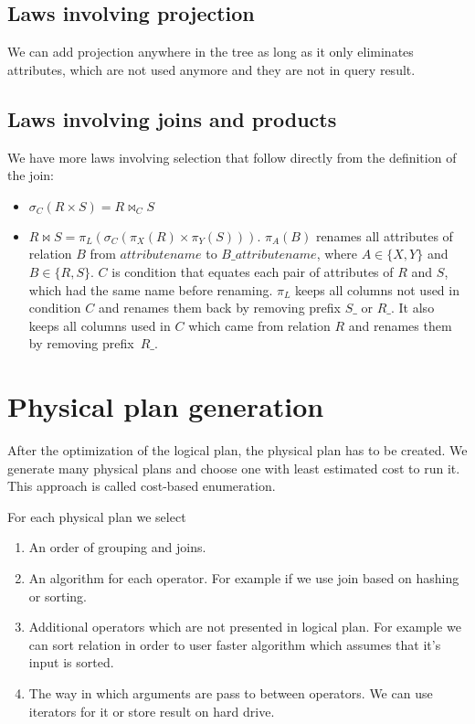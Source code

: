 \subsection{Laws involving projection}
We can add projection anywhere in the tree as long as it only eliminates attributes, which are not used anymore and they are not in query result.

\subsection{Laws involving joins and products}

We have more laws involving selection that follow directly from the definition of the join:
\begin{itemize}
\item $\sigma_{C}(R \times S)=R \Join_{C} S$
\item $R \Join S=\pi_L(\sigma_{C}(\pi_X(R) \times \pi_Y(S)))$. $\pi_A(B)$ renames all attributes of relation $B$ from $attributename$ to $B\_attributename$, where $A\in\{X,Y\}$ and $B\in\{R,S\}$. $C$ is condition that equates each pair of attributes of $R$ and $S$, which had the same name before renaming. $\pi_L$ keeps all columns not used in condition $C$ and renames them back by removing prefix $S\_$ or $R\_$. It also keeps all columns used in $C$ which came from relation $R$ and renames them by removing prefix~$R\_$.
\end{itemize}



\section{Physical plan generation}

After the optimization of the logical plan, the physical plan has to be created. We generate many physical plans and choose one with least estimated cost to run it. This approach is called cost-based enumeration.

For each physical plan we select 
\begin{enumerate}
\item An order of grouping and joins.
\item An algorithm for each operator. For example if we use join based on hashing or sorting.
\item Additional operators which are not presented in logical plan. For example we can sort relation in order to user faster algorithm which assumes that it's input is sorted.
\item The way in which arguments are pass to between operators. We can use iterators for it or store result on hard drive.
\end{enumerate}

